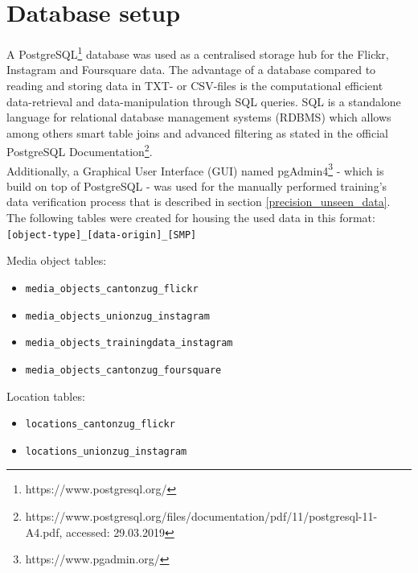 \section{Database setup} \label{database_setup}
A PostgreSQL\footnote{https://www.postgresql.org/} database was used as a centralised storage hub for the Flickr, Instagram and Foursquare data. The advantage of a database compared to reading and storing data in TXT- or CSV-files is the computational efficient data-retrieval and data-manipulation through SQL queries. SQL is a standalone language for relational database management systems (RDBMS) which allows among others smart table joins and advanced filtering as stated in the official PostgreSQL Documentation\footnote{https://www.postgresql.org/files/documentation/pdf/11/postgresql-11-A4.pdf, accessed: 29.03.2019}.\\
Additionally, a Graphical User Interface (GUI) named pgAdmin4\footnote{https://www.pgadmin.org/} - which is build on top of PostgreSQL - was used for the manually performed training's data verification process that is described in section \ref{precision_unseen_data}.\\
The following tables were created for housing the used data in this format:\\ \texttt{[object-type]\_[data-origin]\_[SMP]} \\
\newline

Media object tables:

\begin{itemize}
    \item \texttt{media\_objects\_cantonzug\_flickr}
    \item \texttt{media\_objects\_unionzug\_instagram}
    \item \texttt{media\_objects\_trainingdata\_instagram}
    \item \texttt{media\_objects\_cantonzug\_foursquare}
\end{itemize}

Location tables:

\begin{itemize}
    \item \texttt{locations\_cantonzug\_flickr}
    \item \texttt{locations\_unionzug\_instagram}
\end{itemize}

